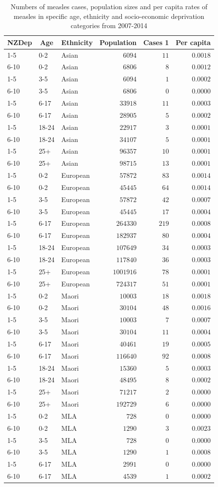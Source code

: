 \documentclass{article}
\begin{document}
\begin{table}\tiny
\caption{Numbers of measles cases, population sizes and per capita rates of measles in specific age, ethnicity and socio-economic deprivation categories from 2007-2014}
\begin{center}
\begin{tabular}{lllrrr}
\hline\hline
\multicolumn{1}{c}{NZDep}&\multicolumn{1}{c}{Age}&\multicolumn{1}{c}{Ethnicity}&\multicolumn{1}{c}{Population}&\multicolumn{1}{c}{Cases 1}&\multicolumn{1}{c}{Per capita}\tabularnewline
\hline
1-5&0-2&Asian&$   6094$&$ 11$&$0.0018$\tabularnewline
6-10&0-2&Asian&$   6806$&$  8$&$0.0012$\tabularnewline
1-5&3-5&Asian&$   6094$&$  1$&$0.0002$\tabularnewline
6-10&3-5&Asian&$   6806$&$  0$&$0.0000$\tabularnewline
1-5&6-17&Asian&$  33918$&$ 11$&$0.0003$\tabularnewline
6-10&6-17&Asian&$  28905$&$  5$&$0.0002$\tabularnewline
1-5&18-24&Asian&$  22917$&$  3$&$0.0001$\tabularnewline
6-10&18-24&Asian&$  34107$&$  5$&$0.0001$\tabularnewline
1-5&25+&Asian&$  96357$&$ 10$&$0.0001$\tabularnewline
6-10&25+&Asian&$  98715$&$ 13$&$0.0001$\tabularnewline
1-5&0-2&European&$  57872$&$ 83$&$0.0014$\tabularnewline
6-10&0-2&European&$  45445$&$ 64$&$0.0014$\tabularnewline
1-5&3-5&European&$  57872$&$ 42$&$0.0007$\tabularnewline
6-10&3-5&European&$  45445$&$ 17$&$0.0004$\tabularnewline
1-5&6-17&European&$ 264330$&$219$&$0.0008$\tabularnewline
6-10&6-17&European&$ 182937$&$ 80$&$0.0004$\tabularnewline
1-5&18-24&European&$ 107649$&$ 34$&$0.0003$\tabularnewline
6-10&18-24&European&$ 117840$&$ 36$&$0.0003$\tabularnewline
1-5&25+&European&$1001916$&$ 78$&$0.0001$\tabularnewline
6-10&25+&European&$ 724317$&$ 51$&$0.0001$\tabularnewline
1-5&0-2&Maori&$  10003$&$ 18$&$0.0018$\tabularnewline
6-10&0-2&Maori&$  30104$&$ 48$&$0.0016$\tabularnewline
1-5&3-5&Maori&$  10003$&$  7$&$0.0007$\tabularnewline
6-10&3-5&Maori&$  30104$&$ 11$&$0.0004$\tabularnewline
1-5&6-17&Maori&$  40461$&$ 19$&$0.0005$\tabularnewline
6-10&6-17&Maori&$ 116640$&$ 92$&$0.0008$\tabularnewline
1-5&18-24&Maori&$  15360$&$  5$&$0.0003$\tabularnewline
6-10&18-24&Maori&$  48495$&$  8$&$0.0002$\tabularnewline
1-5&25+&Maori&$  71217$&$  2$&$0.0000$\tabularnewline
6-10&25+&Maori&$ 192729$&$  6$&$0.0000$\tabularnewline
1-5&0-2&MLA&$    728$&$  0$&$0.0000$\tabularnewline
6-10&0-2&MLA&$   1290$&$  3$&$0.0023$\tabularnewline
1-5&3-5&MLA&$    728$&$  0$&$0.0000$\tabularnewline
6-10&3-5&MLA&$   1290$&$  1$&$0.0008$\tabularnewline
1-5&6-17&MLA&$   2991$&$  0$&$0.0000$\tabularnewline
6-10&6-17&MLA&$   4539$&$  1$&$0.0002$\tabularnewline

\end{tabular}
\end{center}
\end{table}
\end{document}
